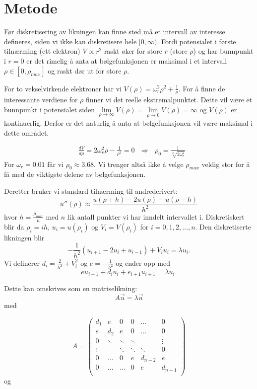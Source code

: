 \documentclass[norsk, 12pt]{article}
\newcommand{\f}{\frac}
\begin{document}
\section{Metode}
Før diskretisering av likningen kan finne sted må et intervall av interesse defineres, siden vi ikke kan diskretisere
hele $[0,\infty)$. Fordi potensialet i første tilnærming (ett elektron) $V\propto r^2$ raskt øker for store $r$ (store $\rho$) og har bunnpunkt i $r=0$ er
det rimelig å anta at bølgefunksjonen er maksimal i et intervall $\rho \in [0, \rho_{max}]$ og raskt dør ut for 
store $\rho$.

For to vekselvirkende elektroner har vi $V(\rho) = \omega_r^2\rho^2+\f{1}{\rho}$. For å finne de interessante verdiene
for $\rho$ finner vi det reelle ekstremalpunktet. Dette vil være et bunnpunkt i potensialet siden 
$\lim\limits_{\rho\rightarrow\infty}V(\rho) = \lim\limits_{\rho\rightarrow0} V(\rho) = \infty$ og $V(\rho)$ er kontinuerlig.
Derfor er det naturlig å anta at bølgefunksjonen vil være maksimal i dette området.

\begin{align*}
&\f{dV}{d\rho}=2\omega_r^2\rho-\f{1}{\rho^2}=0\ \ \ \Rightarrow\ \ \ \rho_{0}=\f{1}{\sqrt[3]{2\omega_r^2}}
\end{align*}
For $\omega_r = 0.01$ får vi $\rho_0 \approx 3.68$. Vi trenger altså ikke å velge $\rho_{max}$ veldig stor for å få med
de viktigste delene av bølgefunksjonen.


Deretter bruker vi standard tilnærming til andrederivert:
$$u''(\rho)\approx \f{u(\rho+h)-2u(\rho)+u(\rho-h)}{h^2}$$
hvor $h=\f{\rho_{max}}{n}$ med $n$ lik antall punkter vi har inndelt intervallet i. Diskretiskert blir da $\rho_i = ih$, $u_i = u(\rho_i)$ og $V_i = V(\rho_i)$
for $i=0,1,2,\dots ,n$. Den diskretiserte likningen blir
$$-\f{1}{h^2}(u_{i+1} -2u_i+u_{i-1}) + V_iu_i = \lambda u_i.$$
Vi definerer $d_i = \f{2}{h^2}+V_i^2$ og $e = -\f{1}{h^2}$ og ender opp med
$$eu_{i-1}+d_iu_i+e_{i+1}u_{i+1} = \lambda u_i.$$

Dette kan omskrives som en matriselikning:
$$A \vec u = \lambda \vec u$$
med

$$ A = \left(\begin{matrix}
 d_1 & e & 0 & 0 & \dots & 0 \\
 e & d_2 & e & 0 & \dots & 0 \\
 0 & \ddots & \ddots & \ddots &  & \vdots \\
 \vdots & & \ddots & \ddots & \ddots & 0 \\
 0 & \dots & 0 & e & d_{n-2} & e\\
 0 & \dots & \dots & 0 & e & d_{n-1} \\
\end{matrix}\right)$$ 
og 
\end{document}
